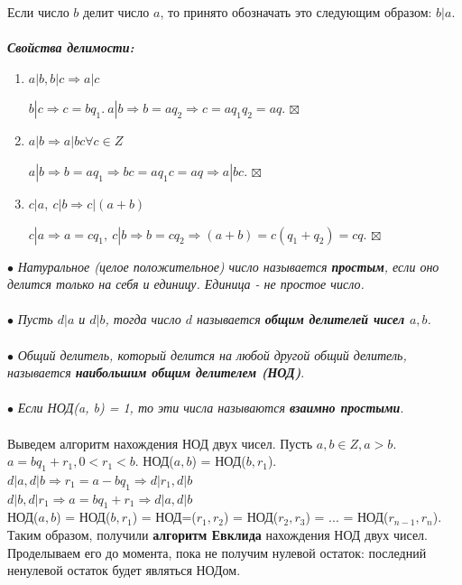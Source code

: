 \documentclass[a4paper, 12pt]{report}
\newenvironment{Proof} %
{\par\noindent{$\blacklozenge$}} %
{\hfill$\scriptstyle\boxtimes$}
\begin{document}
	Если число $b$ делит число $a$, то принято обозначать это следующим образом: $b | a$.\\\\
	\textbf{\textit{Свойства делимости:}}
	\begin{enumerate}
		\item $a | b, b | c \Rightarrow a | c$
		\begin{Proof}
			$b | c \Rightarrow c = bq_1.\ a | b \Rightarrow b = aq_2 \Rightarrow c = aq_1q_2 = aq$.
		\end{Proof}
		\item $a | b \Rightarrow a | bc \forall c \in Z$
		\begin{Proof}
			$a | b \Rightarrow b = aq_1 \Rightarrow bc = aq_1c = aq \Rightarrow a | bc$.
		\end{Proof}
		
		\item $c | a,\ c | b \Rightarrow c|(a + b)$
		\begin{Proof}
			$c | a \Rightarrow a = cq_1,\ c | b \Rightarrow b = cq_2 \Rightarrow (a + b) = c(q_1 + q_2) = cq$.
		\end{Proof}
	\end{enumerate}
	$\bullet$ \textit{Натуральное (целое положительное) число называется \textbf{простым}, если оно делится только на себя и единицу. Единица - не простое число.}\\\\
	$\bullet$ \textit{Пусть $d | a$ и $d | b$, тогда число $d$ называется \textbf{общим делителей чисел $a, b$}.}\\\\
	$\bullet$ \textit{Общий делитель, который делится на любой другой общий делитель, называется \textbf{наибольшим общим делителем (НОД)}}.\\\\
	$\bullet$ \textit{Если НОД(a, b) = 1, то эти числа называются \textbf{взаимно простыми}}.\\\\
	Выведем алгоритм нахождения НОД двух чисел. Пусть $a, b \in Z, a > b$. $a = bq_1 + r_1, 0 < r_1 < b$. НОД($a, b$) = НОД($b, r_1$).\\
	$d|a, d|b \Rightarrow r_1 = a - bq_1 \Rightarrow d | r_1, d|b$\\
	$d|b, d|r_1 \Rightarrow a = bq_1 + r_1 \Rightarrow d | a, d|b$\\
	НОД($a, b$) = НОД($b, r_1$) = НОД=($r_1, r_2$) = НОД($r_2, r_3$) = ... = НОД($r_{n-1}, r_n$).\\
	Таким образом, получили \textbf{алгоритм Евклида} нахождения НОД двух чисел. Проделываем его до момента, пока не получим нулевой остаток: последний ненулевой остаток будет являться НОДом.\\\\
\end{document}
